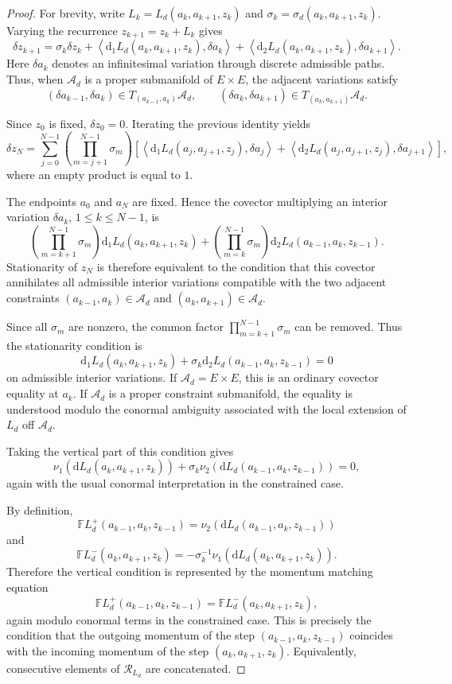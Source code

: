\documentclass[11pt]{article}
\newcommand{\dd}{\mathrm{d}}
\newcommand{\mc}[1]{\mathcal{#1}}
\newcommand{\FL}{\mathbb{F}L}
\begin{document}
\begin{proof}
For brevity, write \(L_k=L_d(a_k,a_{k+1},z_k)\) and
\(\sigma_k=\sigma_d(a_k,a_{k+1},z_k)\). Varying the recurrence
\(z_{k+1}=z_k+L_k\) gives
\[
\delta z_{k+1}
=
\sigma_k\delta z_k
+
\left\langle \dd_1L_d(a_k,a_{k+1},z_k),\delta a_k\right\rangle
+
\left\langle \dd_2L_d(a_k,a_{k+1},z_k),\delta a_{k+1}\right\rangle .
\]
Here \(\delta a_k\) denotes an infinitesimal variation through discrete
admissible paths. Thus, when \(\mc A_d\) is a proper submanifold of
\(E\times E\), the adjacent variations satisfy
\[
(\delta a_{k-1},\delta a_k)\in T_{(a_{k-1},a_k)}\mc A_d,
\qquad
(\delta a_k,\delta a_{k+1})\in T_{(a_k,a_{k+1})}\mc A_d .
\]

Since \(z_0\) is fixed, \(\delta z_0=0\). Iterating the previous identity yields
\[
\delta z_N
=
\sum_{j=0}^{N-1}
\left(
\prod_{m=j+1}^{N-1}\sigma_m
\right)
\left[
\left\langle \dd_1L_d(a_j,a_{j+1},z_j),\delta a_j\right\rangle
+
\left\langle \dd_2L_d(a_j,a_{j+1},z_j),\delta a_{j+1}\right\rangle
\right],
\]
where an empty product is equal to \(1\).

The endpoints \(a_0\) and \(a_N\) are fixed. Hence the covector multiplying an
interior variation \(\delta a_k\), \(1\leq k\leq N-1\), is
\[
\left(
\prod_{m=k+1}^{N-1}\sigma_m
\right)
\dd_1L_d(a_k,a_{k+1},z_k)
+
\left(
\prod_{m=k}^{N-1}\sigma_m
\right)
\dd_2L_d(a_{k-1},a_k,z_{k-1}).
\]
Stationarity of \(z_N\) is therefore equivalent to the condition that this
covector annihilates all admissible interior variations compatible with the two
adjacent constraints \((a_{k-1},a_k)\in\mc A_d\) and
\((a_k,a_{k+1})\in\mc A_d\).

Since all \(\sigma_m\) are nonzero, the common factor
\(\prod_{m=k+1}^{N-1}\sigma_m\) can be removed. Thus the stationarity condition
is
\[
\dd_1L_d(a_k,a_{k+1},z_k)
+
\sigma_k
\dd_2L_d(a_{k-1},a_k,z_{k-1})
=0
\]
on admissible interior variations. If \(\mc A_d=E\times E\), this is an
ordinary covector equality at \(a_k\). If \(\mc A_d\) is a proper constraint
submanifold, the equality is understood modulo the conormal ambiguity
associated with the local extension of \(L_d\) off \(\mc A_d\).

Taking the vertical part of this condition gives
\[
\nu_1(\dd L_d(a_k,a_{k+1},z_k))
+
\sigma_k
\nu_2(\dd L_d(a_{k-1},a_k,z_{k-1}))
=0,
\]
again with the usual conormal interpretation in the constrained case.

By definition,
\[
\FL_d^+(a_{k-1},a_k,z_{k-1})
=
\nu_2(\dd L_d(a_{k-1},a_k,z_{k-1}))
\]
and
\[
\FL_d^-(a_k,a_{k+1},z_k)
=
-\sigma_k^{-1}
\nu_1(\dd L_d(a_k,a_{k+1},z_k)).
\]
Therefore the vertical condition is represented by the momentum matching
equation
\[
\FL_d^+(a_{k-1},a_k,z_{k-1})
=
\FL_d^-(a_k,a_{k+1},z_k),
\]
again modulo conormal terms in the constrained case. This is precisely the
condition that the outgoing momentum of the step
\((a_{k-1},a_k,z_{k-1})\) coincides with the incoming momentum of the step
\((a_k,a_{k+1},z_k)\). Equivalently, consecutive elements of
\(\mc R_{L_d}\) are concatenated.
\end{proof}
\end{document}
